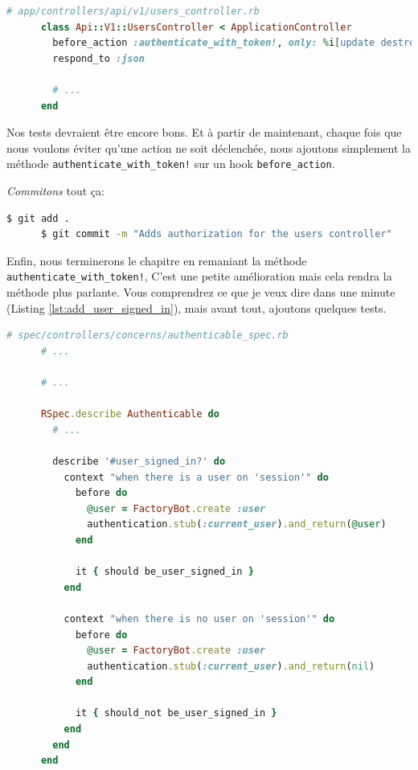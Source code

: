 \documentclass[]{report}
\begin{document}
    \begin{scriptsize}
      \begin{lstlisting}[language=ruby, caption={Utilisation de la méthode before\_action pour le controlleur des utilisateurs}, label={lst:add_before_action_to_users}]
      # app/controllers/api/v1/users_controller.rb
      class Api::V1::UsersController < ApplicationController
        before_action :authenticate_with_token!, only: %i[update destroy]
        respond_to :json

        # ...
      end
      \end{lstlisting}
    \end{scriptsize}

    Nos tests devraient être encore bons. Et à partir de maintenant, chaque fois que nous voulons éviter qu'une action ne soit déclenchée, nous ajoutons simplement la méthode \verb|authenticate_with_token!| sur un hook \verb|before_action|.

    \textit{Commitons} tout ça:

    \begin{scriptsize}
      \begin{lstlisting}[language=bash]
      $ git add .
      $ git commit -m "Adds authorization for the users controller"
      \end{lstlisting}
    \end{scriptsize}

    Enfin, nous terminerons le chapitre en remaniant la méthode \verb|authenticate_with_token!|, C'est une petite amélioration mais cela rendra la méthode plus parlante. Vous comprendrez ce que je veux dire dans une minute (Listing \ref{lst:add_user_signed_in}), mais avant tout, ajoutons quelques tests.

    \begin{scriptsize}
      \begin{lstlisting}[language=ruby, caption={Création du test user\_signed\_in?}, label={lst:add_user_signed_in_test}]
      # spec/controllers/concerns/authenticable_spec.rb
      # ...

      # ...

      RSpec.describe Authenticable do
        # ...

        describe '#user_signed_in?' do
          context "when there is a user on 'session'" do
            before do
              @user = FactoryBot.create :user
              authentication.stub(:current_user).and_return(@user)
            end

            it { should be_user_signed_in }
          end

          context "when there is no user on 'session'" do
            before do
              @user = FactoryBot.create :user
              authentication.stub(:current_user).and_return(nil)
            end

            it { should_not be_user_signed_in }
          end
        end
      end
      \end{lstlisting}
    \end{scriptsize}
\end{document}
